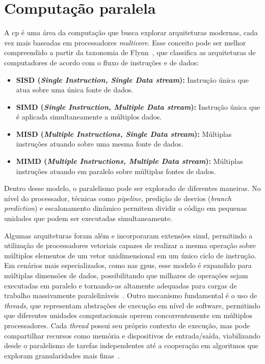 \section{Computação paralela}\label{sec:compParalela}

A \gls{cp} é uma área da computação que busca explorar arquiteturas modernas, cada vez mais baseadas em processadores \textit{multicore}. Esse conceito pode ser melhor compreendido a partir da taxonomia de Flynn~\cite{flynn1972}, que classifica as arquiteturas de computadores de acordo com o fluxo de instruções e de dados:

\begin{itemize}
    \item \textbf{SISD (\textit{Single Instruction, Single Data stream}):} Instrução única que atua sobre uma única fonte de dados.
    \item \textbf{SIMD (\textit{Single Instruction, Multiple Data stream}):} Instrução única que é aplicada simultaneamente a múltiplos dados.
    \item \textbf{MISD (\textit{Multiple Instructions, Single Data stream}):} Múltiplas instruções atuando sobre uma mesma fonte de dados.
    \item \textbf{MIMD (\textit{Multiple Instructions, Multiple Data stream}):} Múltiplas instruções atuando em paralelo sobre múltiplas fontes de dados.
\end{itemize}

Dentro desse modelo, o paralelismo pode ser explorado de diferentes maneiras. No nível do processador, técnicas como \textit{pipeline}, predição de desvios (\textit{branch prediction}) e escalonamento dinâmico permitem dividir o código em pequenas unidades que podem ser executadas simultaneamente.

Algumas arquiteturas foram além e incorporaram extensões \gls{simd}, permitindo a utilização de processadores vetoriais capazes de realizar a mesma operação sobre múltiplos elementos de um vetor unidimensional em um único ciclo de instrução. Em cenários mais especializados, como nas \glspl{gpu}, esse modelo é expandido para múltiplas dimensões de dados, possibilitando que milhares de operações sejam executadas em paralelo e tornando-as altamente adequadas para cargas de trabalho massivamente paralelizáveis~\cite{hennessy2017}. Outro mecanismo fundamental é o uso de \textit{threads}, que representam abstrações de execução em nível de software, permitindo que diferentes unidades computacionais operem concorrentemente em múltiplos processadores. Cada \textit{thread} possui seu próprio contexto de execução, mas pode compartilhar recursos como memória e dispositivos de entrada/saída, viabilizando desde o paralelismo de tarefas independentes até a cooperação em algoritmos que exploram granularidades mais finas~\cite{tanenbaum2015,hennessy2017}.

